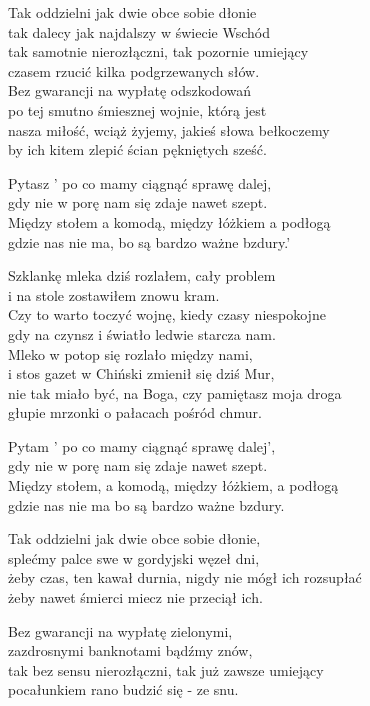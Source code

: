 \begin{text}

    Tak oddzielni jak dwie obce sobie dłonie\\
    tak dalecy jak najdalszy w świecie Wschód\\
    tak samotnie nierozłączni, tak pozornie umiejący\\
    czasem rzucić kilka podgrzewanych słów.\\
    Bez gwarancji na wypłatę odszkodowań\\
    po tej smutno śmiesznej wojnie, którą jest\\
    nasza miłość, wciąż żyjemy, jakieś słowa bełkoczemy\\
    by ich kitem zlepić ścian pękniętych sześć.

    Pytasz ' po co mamy ciągnąć sprawę dalej,\\
    gdy nie w porę nam się zdaje nawet szept.\\
    Między stołem a komodą, między łóżkiem a podłogą\\
    gdzie nas nie ma, bo są bardzo ważne bzdury.'

    Szklankę mleka dziś rozlałem, cały problem\\
    i na stole zostawiłem znowu kram.\\
    Czy to warto toczyć wojnę, kiedy czasy niespokojne\\
    gdy na czynsz i światło ledwie starcza nam.\\
    Mleko w potop się rozlało między nami,\\
    i stos gazet w Chiński zmienił się dziś Mur,\\
    nie tak miało być, na Boga, czy pamiętasz moja droga\\
    głupie mrzonki o pałacach pośród chmur.

    Pytam ' po co mamy ciągnąć sprawę dalej',\\
    gdy nie w porę nam się zdaje nawet szept.\\
    Między stołem, a komodą, między łóżkiem, a podłogą\\
    gdzie nas nie ma bo są bardzo ważne bzdury.

    Tak oddzielni jak dwie obce sobie dłonie,\\
    splećmy palce swe w gordyjski węzeł dni,\\
    żeby czas, ten kawał durnia, nigdy nie mógł ich rozsupłać\\
    żeby nawet śmierci miecz nie przeciął ich.

    Bez gwarancji na wypłatę zielonymi,\\
    zazdrosnymi banknotami bądźmy znów,\\
    tak bez sensu nierozłączni, tak już zawsze umiejący\\
    pocałunkiem rano budzić się - ze snu.
    
\end{text}
